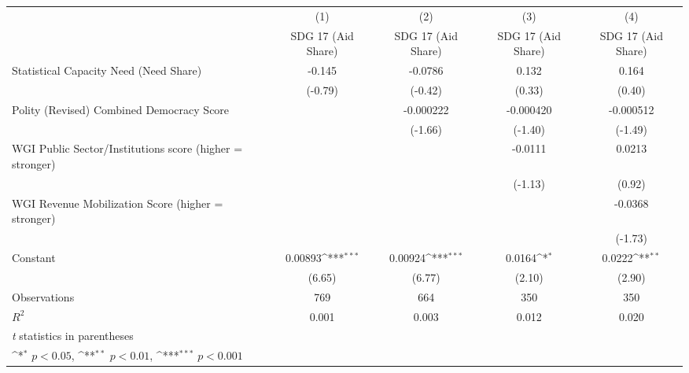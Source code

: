 {
\def\sym#1{\ifmmode^{#1}\else\(^{#1}\)\fi}
\begin{tabular}{l*{4}{c}}
\hline\hline
                &\multicolumn{1}{c}{(1)}&\multicolumn{1}{c}{(2)}&\multicolumn{1}{c}{(3)}&\multicolumn{1}{c}{(4)}\\
                &\multicolumn{1}{c}{SDG 17 (Aid Share)}&\multicolumn{1}{c}{SDG 17 (Aid Share)}&\multicolumn{1}{c}{SDG 17 (Aid Share)}&\multicolumn{1}{c}{SDG 17 (Aid Share)}\\
\hline
Statistical Capacity Need (Need Share)&   -0.145         &  -0.0786         &    0.132         &    0.164         \\
                &  (-0.79)         &  (-0.42)         &   (0.33)         &   (0.40)         \\
[1em]
Polity (Revised) Combined Democracy Score&                  &-0.000222         &-0.000420         &-0.000512         \\
                &                  &  (-1.66)         &  (-1.40)         &  (-1.49)         \\
[1em]
WGI Public Sector/Institutions score (higher = stronger)&                  &                  &  -0.0111         &   0.0213         \\
                &                  &                  &  (-1.13)         &   (0.92)         \\
[1em]
WGI Revenue Mobilization Score (higher = stronger)&                  &                  &                  &  -0.0368         \\
                &                  &                  &                  &  (-1.73)         \\
[1em]
Constant        &  0.00893\sym{***}&  0.00924\sym{***}&   0.0164\sym{*}  &   0.0222\sym{**} \\
                &   (6.65)         &   (6.77)         &   (2.10)         &   (2.90)         \\
\hline
Observations    &      769         &      664         &      350         &      350         \\
\(R^{2}\)       &    0.001         &    0.003         &    0.012         &    0.020         \\
\hline\hline
\multicolumn{5}{l}{\footnotesize \textit{t} statistics in parentheses}\\
\multicolumn{5}{l}{\footnotesize \sym{*} \(p<0.05\), \sym{**} \(p<0.01\), \sym{***} \(p<0.001\)}\\
\end{tabular}
}
